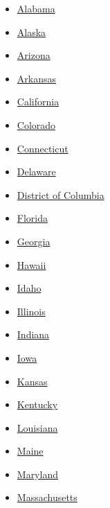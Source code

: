 \begin{itemize}
\tightlist
\item
  \href{//www.nytimes.com/elections/2016/results/alabama}{Alabama}
\item
  \href{//www.nytimes.com/elections/2016/results/alaska}{Alaska}
\item
  \href{//www.nytimes.com/elections/2016/results/arizona}{Arizona}
\item
  \href{//www.nytimes.com/elections/2016/results/arkansas}{Arkansas}
\item
  \href{//www.nytimes.com/elections/2016/results/california}{California}
\item
  \href{//www.nytimes.com/elections/2016/results/colorado}{Colorado}
\item
  \href{//www.nytimes.com/elections/2016/results/connecticut}{Connecticut}
\item
  \href{//www.nytimes.com/elections/2016/results/delaware}{Delaware}
\item
  \href{//www.nytimes.com/elections/2016/results/district-of-columbia}{District
  of Columbia}
\item
  \href{//www.nytimes.com/elections/2016/results/florida}{Florida}
\item
  \href{//www.nytimes.com/elections/2016/results/georgia}{Georgia}
\item
  \href{//www.nytimes.com/elections/2016/results/hawaii}{Hawaii}
\item
  \href{//www.nytimes.com/elections/2016/results/idaho}{Idaho}
\item
  \href{//www.nytimes.com/elections/2016/results/illinois}{Illinois}
\item
  \href{//www.nytimes.com/elections/2016/results/indiana}{Indiana}
\item
  \href{//www.nytimes.com/elections/2016/results/iowa}{Iowa}
\item
  \href{//www.nytimes.com/elections/2016/results/kansas}{Kansas}
\item
  \href{//www.nytimes.com/elections/2016/results/kentucky}{Kentucky}
\item
  \href{//www.nytimes.com/elections/2016/results/louisiana}{Louisiana}
\item
  \href{//www.nytimes.com/elections/2016/results/maine}{Maine}
\item
  \href{//www.nytimes.com/elections/2016/results/maryland}{Maryland}
\item
  \href{//www.nytimes.com/elections/2016/results/massachusetts}{Massachusetts}

\end{itemize}
